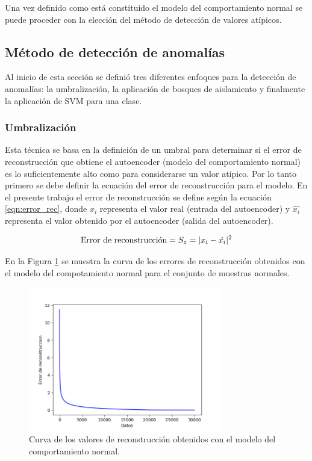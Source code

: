 \vspace{5mm} %

Una vez definido como est\'{a} constituido el modelo del comportamiento normal se puede proceder con la elecci\'{o}n del m\'{e}todo de detecci\'{o}n de valores at\'{i}picos.

\subsection{M\'{e}todo de detecci\'{o}n de anomal\'{i}as}

Al inicio de esta secci\'{o}n se defini\'{o} tres diferentes enfoques para la detecci\'{o}n de anomal\'{i}as: la umbralizaci\'{o}n, la aplicaci\'{o}n de bosques de aislamiento y finalmente la aplicaci\'{o}n de SVM para una clase.

\subsubsection{Umbralizaci\'{o}n}

Esta t\'{e}cnica se basa en la definici\'{o}n de un umbral para determinar si el error de reconstrucci\'{o}n  que obtiene el autoencoder (modelo del comportamiento normal) es lo suficientemente alto como para considerarse un valor at\'{i}pico. Por lo tanto primero se debe definir la ecuaci\'{o}n del error de reconstrucci\'{o}n para el modelo. En el presente trabajo el error de reconstrucci\'{o}n se define seg\'{u}n la ecuaci\'{o}n \ref{eqn:error_rec}, donde $x_{i}$ representa el valor real (entrada del autoencoder) y $\hat{x_{i}}$ representa el valor obtenido por el autoencoder (salida del autoencoder).

\begin{equation}
\textup{Error de reconstrucci\'{o}n} = S_{z} = |x_{i} - \hat{x_{i}}|^{2} 
\label{eqn:error_rec}
\end{equation}

En la Figura \ref{fig:codos} se muestra la curva de los errores de reconstrucci\'{o}n obtenidos con el modelo del compotamiento normal para el conjunto de muestras normales.

\begin{figure}[H]
        \centering
            \includegraphics[width=0.75\textwidth, frame]{imagenes/Cap5/codos}
        \caption{Curva de los valores de reconstrucci\'{o}n obtenidos con el modelo del comportamiento normal.}
		\label{fig:codos}
    \end{figure}


